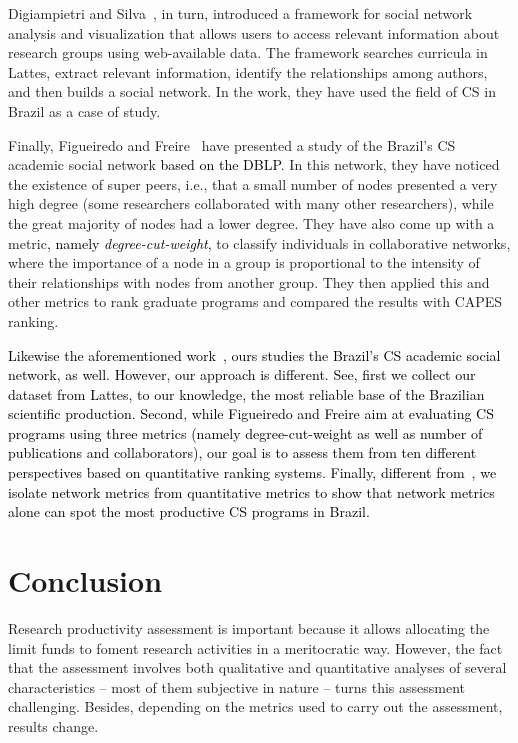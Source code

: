 \documentclass[10pt]{article}
\newcommand{\pedro}[1]{\textcolor{black}{#1}}
\begin{document}
Digiampietri and Silva~\cite{digiampietri2011}, in turn, introduced a framework for social network analysis and visualization that allows
users to access relevant information about research groups using web-available data. The framework searches curricula in
Lattes, extract relevant information, identify the relationships among authors, and then builds a social network.  
In the work, they have used the field of CS in Brazil as a case of study.

Finally, Figueiredo and Freire~\cite{freire2011} have presented a study of the Brazil's CS academic social network \pedro{based on the DBLP}.  In
this network, they have noticed the existence of super peers, i.e., that a small number of nodes presented a very high
degree (some researchers collaborated with many other researchers), while the great majority of nodes had a lower
degree. They have also come up with a metric\pedro{, namely \textit{degree-cut-weight},} to classify individuals in collaborative networks, where the
importance of a node in a group is proportional to the intensity of their relationships with nodes from
another group. They then applied this and other metrics to rank graduate programs and compared the
results with CAPES ranking.

\pedro{Likewise the aforementioned work~\cite{freire2011}, ours studies the Brazil's CS academic social network, as well. However, our approach is different. See, first we collect our dataset from Lattes, to our knowledge, the most reliable base of the Brazilian scientific production. Second, while Figueiredo and Freire aim at evaluating CS programs using three metrics (namely degree-cut-weight as well as number of publications and collaborators), our goal is to assess them from ten different perspectives based on quantitative ranking systems. Finally, different from~\cite{freire2011}, we isolate network metrics from quantitative metrics to show that network metrics alone can spot the most productive CS programs in Brazil.} 



\section*{Conclusion}\label{sec:conclusion}

Research productivity assessment is important because it allows allocating the limit funds to foment research activities in a
meritocratic way. However, the fact that the assessment involves both qualitative and quantitative analyses of several
characteristics -- most of them subjective in nature -- turns this assessment challenging.  Besides, depending on the metrics
used to carry out the assessment, results change. 
\end{document}

